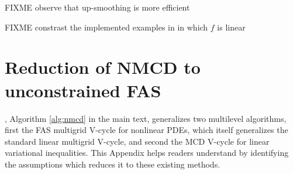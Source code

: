 \documentclass[letterpaper,final,12pt,reqno]{amsart}
\theoremstyle{cstyle}
\theoremstyle{cstyle*}
\theoremstyle{dstyle}
\numberwithin{equation}{section}
\numberwithin{figure}{section}
\numberwithin{table}{section}
\numberwithin{theorem}{section}
\begin{document}
FIXME observe that up-smoothing is more efficient

FIXME constrast the implemented examples in \cite{GraeserKornhuber2009,Tai2003} in which $f$ is linear







\appendix
\section{Reduction of NMCD to unconstrained FAS}

, Algorithm \ref{alg:nmcd} in the main text, generalizes two multilevel algorithms, first the FAS multigrid V-cycle for nonlinear PDEs, which itself generalizes the standard linear multigrid V-cycle, and second the MCD V-cycle for linear variational inequalities.  This Appendix helps readers understand  by identifying the assumptions which reduces it to these existing methods.
\end{document}
